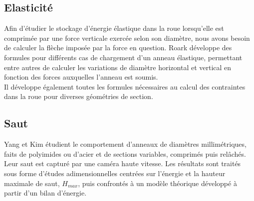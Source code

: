 \subsection{Elasticité}
Afin d’étudier le stockage d’énergie élastique dans la roue lorsqu’elle est comprimée par une force verticale exercée selon son diamètre, nous avons besoin de calculer la flèche imposée par la force en question. Roark \cite{roark} développe des formules pour différents cas de chargement d’un anneau élastique, permettant entre autres de calculer les variations de diamètre horizontal et vertical en fonction des forces auxquelles l’anneau est soumis. \\
Il développe également toutes les formules nécessaires au calcul des contraintes dans la roue pour diverses géométries de section.

\subsection{Saut}
 Yang et Kim \cite{yangkim} étudient le comportement d'anneaux de diamètres millimétriques, faits de polyimides ou d'acier et de sections variables, comprimés puis relâchés. Leur saut est capturé par une caméra haute vitesse. Les résultats sont traités sous forme d'études adimensionnelles centrées sur l'énergie et la hauteur maximale de saut, $H_{max}$, puis confrontés à un modèle théorique développé à partir d'un bilan d'énergie. 
 
